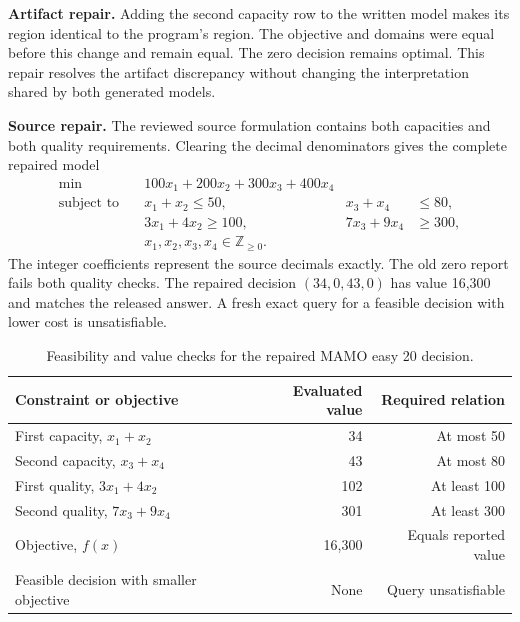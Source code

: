 \textbf{Artifact repair.} Adding the second capacity row to the written model makes its region
identical to the program's region. The objective and domains were equal before this change and
remain equal. The zero decision remains optimal. This repair resolves the artifact discrepancy
without changing the interpretation shared by both generated models.

\textbf{Source repair.} The reviewed source formulation contains both capacities and both
quality requirements. Clearing the decimal denominators gives the complete repaired model
\begin{equation}
\begin{aligned}
\min\quad &100x_1+200x_2+300x_3+400x_4\\
\text{subject to}\quad
 &x_1+x_2\leq50, &x_3+x_4&\leq80,\\
 &3x_1+4x_2\geq100, &7x_3+9x_4&\geq300,\\
 &x_1,x_2,x_3,x_4\in\mathbb Z_{\geq0}.&&
\end{aligned}
\label{eq:mamosourcerepair}
\end{equation}
The integer coefficients represent the source decimals exactly. The old zero report fails both
quality checks. The repaired decision \((34,0,43,0)\) has value 16,300 and matches the released
answer. A fresh exact query for a feasible decision with lower cost is unsatisfiable.

\begin{table}[htbp]
\caption{Feasibility and value checks for the repaired MAMO easy 20 decision.}
\label{tab:mamorepairchecks}
\centering\small\setlength{\tabcolsep}{4pt}
\begin{tabular*}{\textwidth}{@{\extracolsep{\fill}}lrr@{}}
\toprule
Constraint or objective & Evaluated value & Required relation\\
\midrule
First capacity, \(x_1+x_2\) & 34 & At most 50\\
Second capacity, \(x_3+x_4\) & 43 & At most 80\\
First quality, \(3x_1+4x_2\) & 102 & At least 100\\
Second quality, \(7x_3+9x_4\) & 301 & At least 300\\
Objective, \(f(x)\) & 16,300 & Equals reported value\\
Feasible decision with smaller objective & None & Query unsatisfiable\\
\bottomrule
\end{tabular*}
\end{table}

